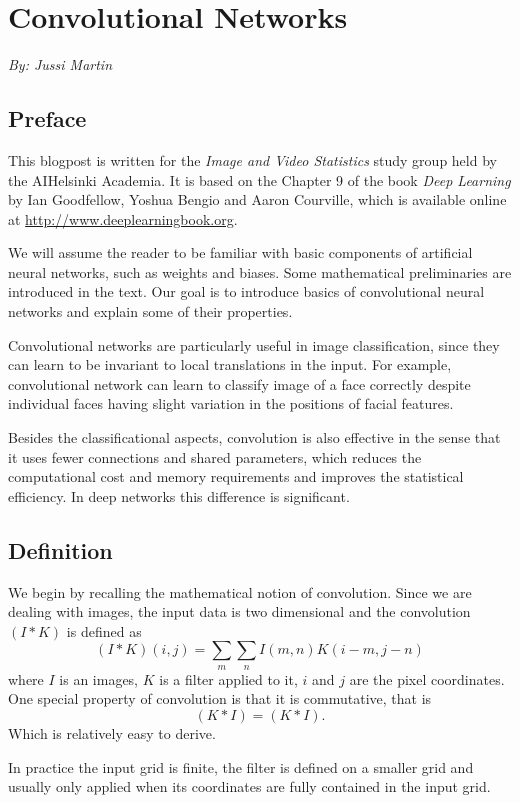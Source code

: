 \documentclass[]{article}
\begin{document}
\section{Convolutional Networks}
\begin{center}
  \emph{By: Jussi Martin}
\end{center}
\subsection{Preface}
This blogpost is written for the \emph{Image and Video Statistics} study group
held by the AIHelsinki Academia. It is based on the Chapter 9 of the book
\emph{Deep Learning} by Ian Goodfellow, Yoshua Bengio and Aaron Courville, which
is available online at \url{http://www.deeplearningbook.org}.

We will assume the reader to be familiar with basic components of artificial
neural networks, such as weights and biases. Some mathematical preliminaries are
introduced in the text. Our goal is to introduce basics of convolutional neural
networks and explain some of their properties.

Convolutional networks are particularly useful in image classification, since
they can learn to be invariant to local translations in the input. For example,
convolutional network can learn to classify image of a face correctly despite
individual faces having slight variation in the positions of facial features.

Besides the classificational aspects, convolution is also effective in the sense
that it uses fewer connections and shared parameters, which reduces the
computational cost and memory requirements and improves the statistical efficiency.
In deep networks this difference is significant.

\subsection{Definition}
We begin by recalling the mathematical notion of convolution.
Since we are dealing with images, the input data is two dimensional and the convolution
$(I * K)$ is defined as
\[
(I * K)(i, j) = \sum_m \sum_n I(m , n) K(i - m, j - n)
\]
where $I$ is an images, $K$ is a filter applied to it, $i$ and $j$ are the
pixel coordinates. One special property of convolution is that it is commutative, that is
\[
 (K * I) = (K * I).
\]
Which is relatively easy to derive.

In practice the input grid is finite, the filter is defined on a smaller grid and
usually only applied when its coordinates are fully contained in the input grid.
\end{document}
